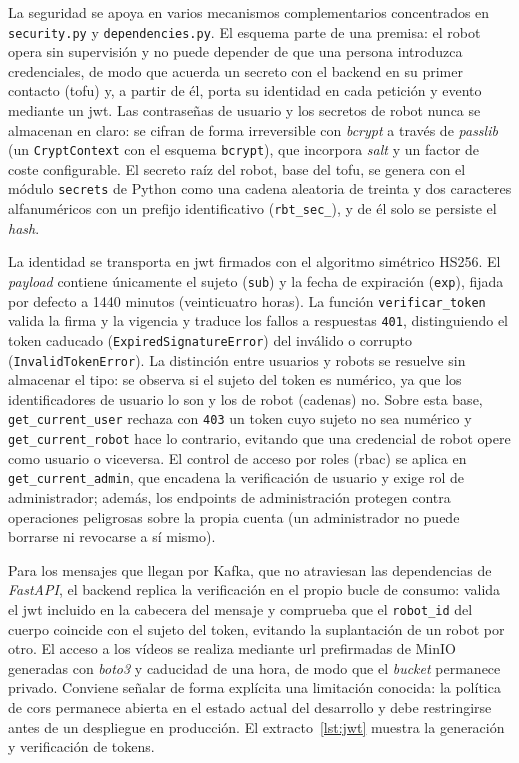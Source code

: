 La seguridad se apoya en varios mecanismos complementarios concentrados en
\texttt{security.py} y \texttt{dependencies.py}. El esquema parte de una premisa: el
robot opera sin supervisión y no puede depender de que una persona introduzca
credenciales, de modo que acuerda un secreto con el backend en su primer contacto
(\gls{tofu}) y, a partir de él, porta su identidad en cada petición y evento mediante
un \gls{jwt}. Las contraseñas de usuario y los
secretos de robot nunca se almacenan en claro: se cifran de forma irreversible con
\textit{bcrypt} a través de \textit{passlib} (un \texttt{CryptContext} con el esquema
\texttt{bcrypt}), que incorpora \textit{salt} y un factor de coste configurable. El
secreto raíz del robot, base del \gls{tofu}, se genera con el módulo \texttt{secrets}
de Python como una cadena aleatoria de treinta y dos caracteres alfanuméricos con un
prefijo identificativo (\texttt{rbt\_sec\_}), y de él solo se persiste el \textit{hash}.

La identidad se transporta en \gls{jwt} firmados con el algoritmo simétrico HS256. El
\textit{payload} contiene únicamente el sujeto (\texttt{sub}) y la fecha de expiración
(\texttt{exp}), fijada por defecto a 1440 minutos (veinticuatro horas). La función
\texttt{verificar\_token} valida la firma y la vigencia y traduce los fallos a
respuestas \texttt{401}, distinguiendo el token caducado
(\texttt{ExpiredSignatureError}) del inválido o corrupto (\texttt{InvalidTokenError}).
La distinción entre usuarios y robots se resuelve sin almacenar el tipo: se observa si
el sujeto del token es numérico, ya que los identificadores de usuario lo son y los de
robot (cadenas) no. Sobre esta base, \texttt{get\_current\_user} rechaza con
\texttt{403} un token cuyo sujeto no sea numérico y \texttt{get\_current\_robot} hace
lo contrario, evitando que una credencial de robot opere como usuario o viceversa. El
control de acceso por roles (\gls{rbac}) se aplica en \texttt{get\_current\_admin}, que
encadena la verificación de usuario y exige rol de administrador; además, los endpoints
de administración protegen contra operaciones peligrosas sobre la propia cuenta (un
administrador no puede borrarse ni revocarse a sí mismo).

Para los mensajes que llegan por Kafka, que no atraviesan las dependencias de
\textit{FastAPI}, el backend replica la verificación en el propio bucle de consumo:
valida el \gls{jwt} incluido en la cabecera del mensaje y comprueba que el
\texttt{robot\_id} del cuerpo coincide con el sujeto del token, evitando la
suplantación de un robot por otro. El acceso a los vídeos se realiza mediante
\acrshort{url} prefirmadas de MinIO generadas con \textit{boto3} y caducidad de una hora,
de modo que el \textit{bucket} permanece privado. Conviene señalar de forma explícita
una limitación conocida: la política de \gls{cors} permanece abierta en el estado
actual del desarrollo y debe restringirse antes de un despliegue en producción. El
extracto~\ref{lst:jwt} muestra la generación y verificación de tokens.

